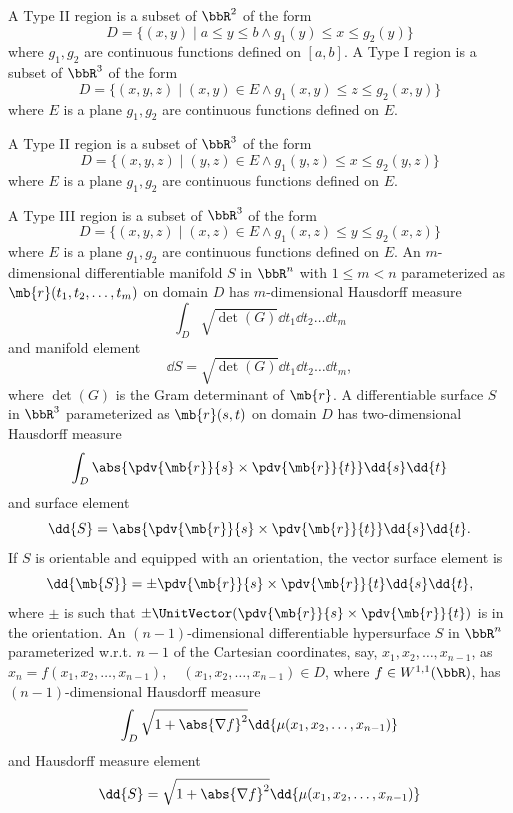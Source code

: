 A Type II region is a subset of $\bbR^2$ of the form
\[D=\{(x,y)\mid a\le y\le b\land g_1(y)\le x\le g_2(y)\}\]
where $g_1,g_2$ are continuous functions defined on $[a,b]$.
A Type I region is a subset of $\bbR^3$ of the form
\[D=\{(x,y,z)\mid (x,y)\in E\land g_1(x,y)\le z\le g_2(x,y)\}\]
where $E$ is a plane $g_1,g_2$ are continuous functions defined on $E$.

A Type II region is a subset of $\bbR^3$ of the form
\[D=\{(x,y,z)\mid (y,z)\in E\land g_1(y,z)\le x\le g_2(y,z)\}\]
where $E$ is a plane $g_1,g_2$ are continuous functions defined on $E$.

A Type III region is a subset of $\bbR^3$ of the form
\[D=\{(x,y,z)\mid (x,z)\in E\land g_1(x,z)\le y\le g_2(x,z)\}\]
where $E$ is a plane $g_1,g_2$ are continuous functions defined on $E$.
An $m$-dimensional differentiable manifold $S$ in $\bbR^n$ with $1\le m<n$ parameterized as $\mb{r}(t_1,t_2,\ldots,t_m)$ on domain $D$ has $m$-dimensional Hausdorff measure
\[\int_D\sqrt{\det(G)}\dd{t_1}\dd{t_2}\ldots\dd{t_m}\]
and manifold element
\[\dd{S}=\sqrt{\det(G)}\dd{t_1}\dd{t_2}\ldots\dd{t_m},\]
where $\det(G)$ is the Gram determinant of $\mb{r}$.
A differentiable surface $S$ in $\bbR^3$ parameterized as $\mb{r}(s,t)$ on domain $D$ has two-dimensional Hausdorff measure
\[\int_D\abs{\pdv{\mb{r}}{s}\times\pdv{\mb{r}}{t}}\dd{s}\dd{t}\]
and surface element
\[\dd{S}=\abs{\pdv{\mb{r}}{s}\times\pdv{\mb{r}}{t}}\dd{s}\dd{t}.\]
If $S$ is orientable and equipped with an orientation, the vector surface element is
\[\dd{\mb{S}}=\pm\pdv{\mb{r}}{s}\times\pdv{\mb{r}}{t}\dd{s}\dd{t},\]
where $\pm$ is such that $\pm\UnitVector(\pdv{\mb{r}}{s}\times\pdv{\mb{r}}{t})$ is in the orientation.
An $(n-1)$-dimensional differentiable hypersurface $S$ in $\bbR^n$ parameterized w.r.t. $n-1$ of the Cartesian coordinates, say, $x_1,x_2,\ldots,x_{n-1}$, as $x_n=f(x_1,x_2,\ldots,x_{n-1}),\quad (x_1,x_2,\ldots,x_{n-1})\in D$, where $f\in W^{1,1}(\bbR)$, has $(n-1)$-dimensional Hausdorff measure
\[\int_D\sqrt{1+\abs{\nabla f}^2}\dd{\mu(x_1,x_2,\ldots,x_{n-1})}\]
and Hausdorff measure element
\[\dd{S}=\sqrt{1+\abs{\nabla f}^2}\dd{\mu(x_1,x_2,\ldots,x_{n-1})}\]
